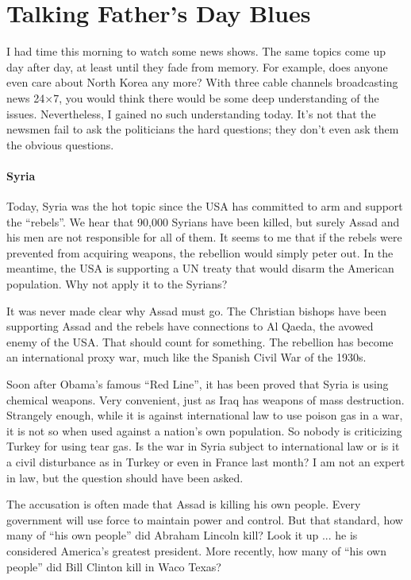 \section{Talking Father’s Day Blues}

I had time this morning to watch some news shows. The same topics come up day after day, at least until they fade from memory. For example, does anyone even care about North Korea any more? With three cable channels broadcasting news 24×7, you would think there would be some deep understanding of the issues. Nevertheless, I gained no such understanding today. It's not that the newsmen fail to ask the politicians the hard questions; they don't even ask them the obvious questions.

\paragraph{Syria}


Today, Syria was the hot topic since the USA has committed to arm and support the ``rebels''. We hear that 90,000 Syrians have been killed, but surely Assad and his men are not responsible for all of them. It seems to me that if the rebels were prevented from acquiring weapons, the rebellion would simply peter out. In the meantime, the USA is supporting a UN treaty that would disarm the American population. Why not apply it to the Syrians?

It was never made clear why Assad must go. The Christian bishops have been supporting Assad and the rebels have connections to Al Qaeda, the avowed enemy of the USA. That should count for something. The rebellion has become an international proxy war, much like the Spanish Civil War of the 1930s.

Soon after Obama's famous ``Red Line'', it has been proved that Syria is using chemical weapons. Very convenient, just as Iraq has weapons of mass destruction. Strangely enough, while it is against international law to use poison gas in a war, it is not so when used against a nation's own population. So nobody is criticizing Turkey for using tear gas. Is the war in Syria subject to international law or is it a civil disturbance as in Turkey or even in France last month? I am not an expert in law, but the question should have been asked.

The accusation is often made that Assad is killing his own people. Every government will use force to maintain power and control. But that standard, how many of ``his own people'' did Abraham Lincoln kill? Look it up ... he is considered America's greatest president. More recently, how many of ``his own people'' did Bill Clinton kill in Waco Texas?

